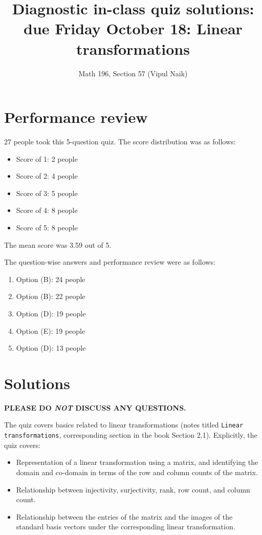 \documentclass[10pt]{amsart}
\title{Diagnostic in-class quiz solutions: due Friday October 18: Linear transformations}
\author{Math 196, Section 57 (Vipul Naik)}
\begin{document}
\maketitle

\section{Performance review}

27 people took this 5-question quiz. The score distribution was as follows:

\begin{itemize}
\item Score of 1: 2 people
\item Score of 2: 4 people
\item Score of 3: 5 people
\item Score of 4: 8 people
\item Score of 5: 8 people
\end{itemize}

The mean score was 3.59 out of 5.

The question-wise answers and performance review were as follows:

\begin{enumerate}
\item Option (B): 24 people
\item Option (B): 22 people
\item Option (D): 19 people
\item Option (E): 19 people
\item Option (D): 13 people
\end{enumerate}
\section{Solutions}

{\bf PLEASE DO {\em NOT} DISCUSS ANY QUESTIONS.}

The quiz covers basics related to linear transformations (notes titled
{\tt Linear transformations}, corresponding section in the book
Section 2.1). Explicitly, the quiz covers:

\begin{itemize}
\item Representation of a linear transformation using a matrix, and
  identifying the domain and co-domain in terms of the row and column
  counts of the matrix.
\item Relationship between injectivity, surjectivity, rank, row count,
  and column count.
\item Relationship between the entries of the matrix and the images of
  the standard basis vectors under the corresponding linear
  transformation.
\end{itemize}
\end{document}

